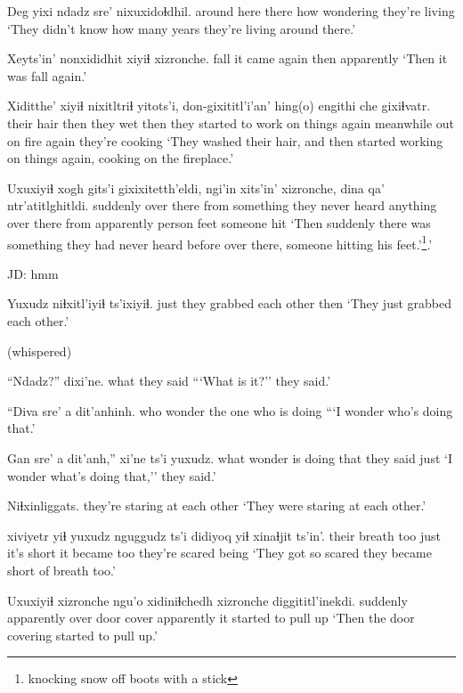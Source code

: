 \documentclass[12pt]{article}
\begin{document}
\gll Deg         yixi  ndadz sre' nixuxidoɬdhil.
{around here} there how wondering {they're living}
\glt `They didn't know how many years they're living around there.'
\glend

\gll Xeyts'in' nonxididhit xiyiɬ xizronche.
fall      {it came again}  then apparently
\glt `Then it was fall again.'
\glend

\gll Xiditthe'  xiyiɬ nixitltriɬ yitots'i, don-gixititl'i'an'    hing(o)  engithi che   gixiɬvatr. 
{their hair} then  {they wet} then {they started to work on things again} meanwhile {out on fire} again {they're cooking}
\glt `They washed their hair, and then started working on things again, cooking on the fireplace.'
\glend

\gll Uxuxiyiɬ xogh gits'i gixixitetth'eldi,   ngi'in     xits'in' xizronche, dina   qa'  ntr'atitlghitldi.
suddenly {over there}  {from something}  {they never heard anything}  {over there} from apparently person feet {someone hit}
\glt `Then suddenly there was something they had never heard before over there, someone hitting his feet.'\footnote{knocking snow off boots with a stick}.'
\glend

JD:  hmm

\gll Yuxudz niɬxitl'iyiɬ           ts'ixiyiɬ.
just   {they grabbed each other} then
\glt `They just grabbed each other.'
\glend  

(whispered)

\gll ``Ndadz?'' dixi'ne. 
what  {they said}
\glt ```What is it?'' they said.'
\glend

\gll ``Diva sre'   a dit'anhinh.
who  wonder {}  {the one who is doing}
\glt ```I wonder who's doing that.'
\glend

\gll Gan sre'    a dit'anh,''    xi'ne     ts'i yuxudz.
what wonder {}  {is doing that} {they said} {}     just
\glt `I wonder what's doing that,'' they said.'
\glend

\gll Niɬxinliggats.
{{they're staring at each other}}
\glt `They were staring at each other.'
\glend

 xiviyetr     yiɬ yuxudz nguggudz   ts'i didiyoq   yiɬ xinaɬjit       ts'in'.
{}           {their breath} too just   {it's short}  {}    {it became} too {they're scared} being
\glt `They got so scared they became short of breath too.'
\glend

\gll Uxuxiyiɬ xizronche ngu'o xidiniɬchedh xizronche diggititl'inekdi.
suddenly  apparently   over  {door cover}   apparently {it started to pull up}
\glt `Then the door covering started to pull up.'
\glend
\end{document}

